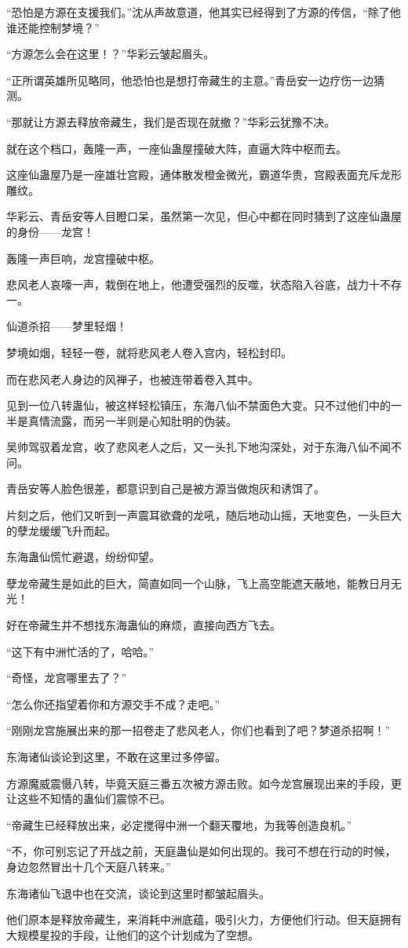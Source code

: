 \begin{this_body}
“恐怕是方源在支援我们。”沈从声故意道，他其实已经得到了方源的传信，“除了他谁还能控制梦境？”

“方源怎么会在这里！？”华彩云皱起眉头。

“正所谓英雄所见略同，他恐怕也是想打帝藏生的主意。”青岳安一边疗伤一边猜测。

“那就让方源去释放帝藏生，我们是否现在就撤？”华彩云犹豫不决。

就在这个档口，轰隆一声，一座仙蛊屋撞破大阵，直逼大阵中枢而去。

这座仙蛊屋乃是一座雄壮宫殿，通体散发橙金微光，霸道华贵，宫殿表面充斥龙形雕纹。

华彩云、青岳安等人目瞪口呆，虽然第一次见，但心中都在同时猜到了这座仙蛊屋的身份——龙宫！

轰隆一声巨响，龙宫撞破中枢。

悲风老人哀嚎一声，栽倒在地上，他遭受强烈的反噬，状态陷入谷底，战力十不存一。

仙道杀招——梦里轻烟！

梦境如烟，轻轻一卷，就将悲风老人卷入宫内，轻松封印。

而在悲风老人身边的风禅子，也被连带着卷入其中。

见到一位八转蛊仙，被这样轻松镇压，东海八仙不禁面色大变。只不过他们中的一半是真情流露，而另一半则是心知肚明的伪装。

吴帅驾驭着龙宫，收了悲风老人之后，又一头扎下地沟深处，对于东海八仙不闻不问。

青岳安等人脸色很差，都意识到自己是被方源当做炮灰和诱饵了。

片刻之后，他们又听到一声震耳欲聋的龙吼，随后地动山摇，天地变色，一头巨大的孽龙缓缓飞升而起。

东海蛊仙慌忙避退，纷纷仰望。

孽龙帝藏生是如此的巨大，简直如同一个山脉，飞上高空能遮天蔽地，能教日月无光！

好在帝藏生并不想找东海蛊仙的麻烦，直接向西方飞去。

“这下有中洲忙活的了，哈哈。”

“奇怪，龙宫哪里去了？”

“怎么你还指望着你和方源交手不成？走吧。”

“刚刚龙宫施展出来的那一招卷走了悲风老人，你们也看到了吧？梦道杀招啊！”

东海诸仙谈论到这里，不敢在这里过多停留。

方源魔威震慑八转，毕竟天庭三番五次被方源击败。如今龙宫展现出来的手段，更让这些不知情的蛊仙们震惊不已。

“帝藏生已经释放出来，必定搅得中洲一个翻天覆地，为我等创造良机。”

“不，你可别忘记了开战之前，天庭蛊仙是如何出现的。我可不想在行动的时候，身边忽然冒出十几个天庭八转来。”

东海诸仙飞退中也在交流，谈论到这里时都皱起眉头。

他们原本是释放帝藏生，来消耗中洲底蕴，吸引火力，方便他们行动。但天庭拥有大规模星投的手段，让他们的这个计划成为了空想。

\end{this_body}

